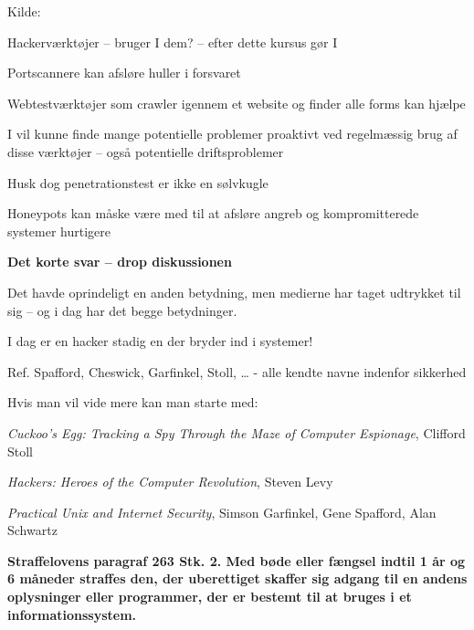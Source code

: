\documentclass[20pt,landscape,a4paper,footrule]{foils}
\begin{document}
\vskip 1cm
Kilde:



\begin{list1}
\item Hackerværktøjer -- bruger I dem? -- efter dette kursus gør I
\item Portscannere kan afsløre huller i forsvaret
\item Webtestværktøjer som crawler igennem et website og finder alle
  forms kan hjælpe
\item I vil kunne finde mange potentielle problemer proaktivt ved
  regelmæssig brug af disse værktøjer -- også potentielle driftsproblemer
\item Husk dog penetrationstest er ikke en sølvkugle
\item Honeypots kan måske være med til at afsløre angreb og
  kompromitterede systemer hurtigere
\end{list1}



{\bfseries Det korte svar -- drop diskussionen}

Det havde oprindeligt en anden betydning, men medierne har taget
udtrykket til sig -- og i dag har det begge betydninger.

{\color{red}\hlkbig I dag er en hacker stadig en der bryder ind i systemer!}

Ref. Spafford, Cheswick, Garfinkel, Stoll, \ldots
- alle kendte navne indenfor sikkerhed

Hvis man vil vide mere kan man starte med:
\begin{list2}
\item \emph{Cuckoo's Egg: Tracking a Spy Through the Maze of Computer
 Espionage},  Clifford Stoll
\item \emph{Hackers: Heroes of the Computer Revolution},
Steven Levy
\item \emph{Practical Unix and Internet Security},
Simson Garfinkel, Gene Spafford, Alan Schwartz
\end{list2}


{\bfseries Straffelovens paragraf 263 Stk. 2. Med bøde eller fængsel indtil 1 år og 6 måneder straffes den, der uberettiget skaffer sig adgang til en andens oplysninger eller programmer, der er bestemt til at bruges i et informationssystem. }
\end{document}
